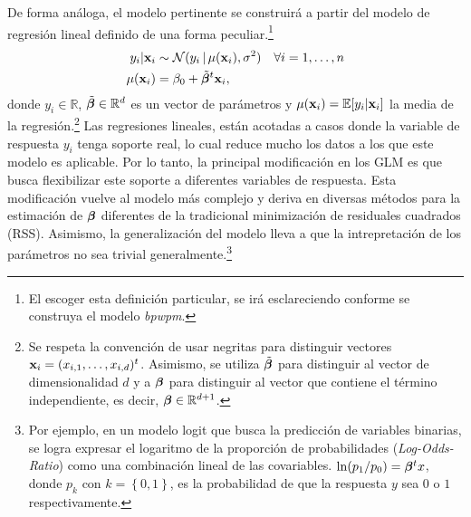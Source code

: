 \documentclass[../Main/Main.tex]{subfiles}
\begin{document}
De forma análoga, el modelo pertinente se construirá a partir del modelo de regresión lineal definido de una forma peculiar.\footnote{El escoger esta definición particular, se irá esclareciendo conforme se construya el modelo \textit{bpwpm}.}
\begin{align*}
	y_i|\mathbf{x}_i &\sim \mathcal{N}(y_i \,|\,\mu(\mathbf{x}_i), \sigma^2)  \quad \forall i = 1,\ldots,n\\
	\mu(\mathbf{x}_i) &= \beta_0 + \tilde{\bm{\beta}}^t\mathbf{x}_i,
\end{align*}
donde $y_i \in\mathbb{R}$, $\tilde{\bm{\beta}} \in \mathbb{R}^{d}$ es un vector de parámetros y $\mu(\mathbf{x}_i) = \mathbb{E}[y_i|\mathbf{x}_i]$ la media de la regresión.\footnote{Se respeta la convención de usar negritas para distinguir vectores $\mathbf{x}_i = (x_{i,1},\ldots,x_{i,d})^t$. Asimismo, se utiliza $\tilde{\bm{\beta}}$ para distinguir al vector de dimensionalidad $d$ y a $\bm{\beta}$ para distinguir al vector que contiene el término independiente, es decir, $\bm{\beta}\in \mathbb{R}^{d+1}$.} Las regresiones lineales, están acotadas a casos donde la variable de respuesta $y_i$ tenga soporte real, lo cual reduce mucho los datos a los que este modelo es aplicable. Por lo tanto, la principal modificación en los GLM es que busca flexibilizar este soporte a diferentes variables de respuesta. Esta modificación vuelve al modelo más complejo y deriva en diversas métodos para la estimación de $\bm{\beta}$ diferentes de la tradicional minimización de residuales cuadrados (RSS).  Asimismo, la generalización del modelo lleva a que la intrepretación de los parámetros no sea trivial generalmente.\footnote{Por ejemplo, en un modelo logit que busca la predicción de variables binarias, se logra expresar el logaritmo de la proporción de probabilidades (\textit{Log-Odds-Ratio}) como una combinación lineal de las covariables. $\ln(p_1 / p_0) = \bm{\beta}^t x$, donde $p_k$ con  $k = \left\{0,1\right\}$, es la probabilidad de que la respuesta $y$ sea $0$ o $1$ respectivamente.}
\vfill
\pagebreak
\end{document}
